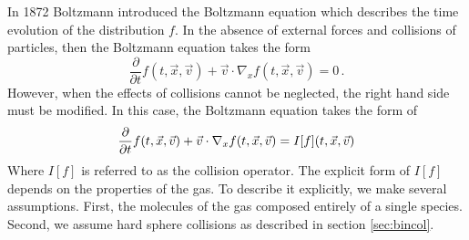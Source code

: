 \documentclass[12pt]{CSUNthesis}
\newcommand{\dydx}[2]{\frac{\partial{#1}}{\partial{#2}}}
\newcommand{\vecx}{\vec{x}}
\newcommand{\vecv}{\vec{v}}
\begin{document}
In 1872 Boltzmann \cite{Boltzmann1872} introduced the Boltzmann equation which describes the time evolution of the distribution $f$. In the absence of external forces and collisions of particles, then the Boltzmann equation takes the form
\begin{equation}
\label{eq:colless_boltzmann}
\dydx{}{t}f(t, \vecx, \vecv) + \vecv \cdot \nabla_x f(t, \vecx, \vecv) = 0\, .
\end{equation}
However, when the effects of collisions cannot be neglected, the right hand side must be modified. In this case, the Boltzmann equation takes the form of
\begin{equation}
\label{eq:boltzmann}
\dydx{}{t}f(t, \vecx, \vecv) + \vecv \cdot \nabla_x f(t, \vecx, \vecv) = I[f](t,\vecx,\vecv)\, \\ 
\end{equation}
Where $I[f]$ is referred to as the collision operator. The explicit form of $I[f]$ depends on the properties of the gas. To describe it explicitly, we make several assumptions. 
First, the molecules of the gas composed entirely of a single species. Second, we assume hard sphere collisions as described in section \ref{sec:bincol}.  
	
\end{document}
